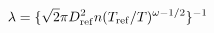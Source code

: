 \documentclass[12pt]{article}
\begin{document}
$$ 
  \lambda =  \{\sqrt{2} \pi D_{\rm ref}^2 n (T_{\rm ref}/T)^{\omega - 1/2} \}^{-1}
$$
\end{document}
